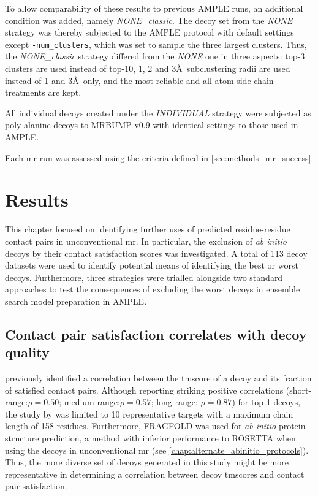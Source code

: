 To allow comparability of these results to previous AMPLE runs, an additional condition was added, namely \textit{NONE\_classic}. The decoy set from the \textit{NONE} strategy was thereby subjected to the AMPLE protocol with default settings except \texttt{-num\_clusters}, which was set to sample the three largest clusters. Thus, the \textit{NONE\_classic} strategy differed from the \textit{NONE} one in three aspects: top-3 clusters are used instead of top-10, 1, 2 and 3\AA\ subclustering radii are used instead of 1 and 3\AA\ only, and the most-reliable and all-atom side-chain treatments are kept.

All individual decoys created under the \textit{INDIVIDUAL} strategy were subjected as poly-alanine decoys to MRBUMP v0.9 \cite{Keegan2018-kn} with identical settings to those used in AMPLE. 

Each \gls{mr} run was assessed using the criteria defined in \cref{sec:methods_mr_success}.

\section{Results}
This chapter focused on identifying further uses of predicted residue-residue contact pairs in unconventional \gls{mr}. In particular, the exclusion of \textit{ab initio} decoys by their contact satisfaction scores was investigated. A total of 113 decoy datasets were used to identify potential means of identifying the best or worst decoys. Furthermore, three strategies were trialled alongside two standard approaches to test the consequences of excluding the worst decoys in ensemble search model preparation in AMPLE.

\subsection{Contact pair satisfaction correlates with decoy quality} \label{subsec:ample_saint2_concorr}
\textcite{Kosciolek2014-bt} previously identified a correlation between the \gls{tmscore} of a decoy and its fraction of satisfied contact pairs. Although reporting striking positive correlations (short-range:$\rho=0.50$; medium-range:$\rho=0.57$; long-range: $\rho=0.87$) for top-1 decoys, the study by \textcite{Kosciolek2014-bt} was limited to 10 representative targets with a maximum chain length of 158 residues. Furthermore, FRAGFOLD \cite{Jones2001-mc} was used for \textit{ab initio} protein structure prediction, a method with inferior performance to ROSETTA \cite{Rohl2004-dj} when using the decoys in unconventional \gls{mr} (see \cref{chap:alternate_abinitio_protocols}). Thus, the more diverse set of decoys generated in this study might be more representative in determining a correlation between decoy \gls{tmscore}s and contact pair satisfaction.

